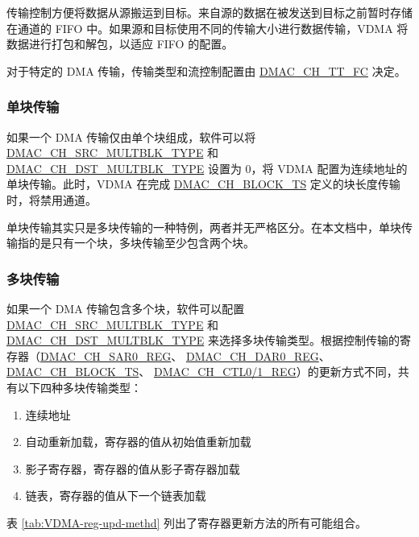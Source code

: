 \documentclass[main\_\_CN.tex]{subfiles}
\begin{document}
传输控制方便将数据从源搬运到目标。来自源的数据在被发送到目标之前暂时存储在通道的 FIFO 中。如果源和目标使用不同的传输大小进行数据传输，VDMA 将数据进行打包和解包，以适应 FIFO 的配置。

对于特定的 DMA 传输，传输类型和流控制配置由 \hyperref[fielddesc:DMACCHNTTFC]{DMAC\_CH\_TT\_FC} 决定。

\subsubsection{单块传输}

如果一个 DMA 传输仅由单个块组成，软件可以将 \hyperref[fielddesc:DMACCHNSRCMULTBLKTYPE]{DMAC\_CH\_SRC\_MULTBLK\_TYPE} 和 \hyperref[fielddesc:DMACCHNDSTMULTBLKTYPE]{DMAC\_CH\_DST\_MULTBLK\_TYPE} 设置为 0，将 VDMA 配置为连续地址的单块传输。此时，VDMA 在完成 \hyperref[fielddesc:DMACCHNBLOCKTS]{DMAC\_CH\_BLOCK\_TS} 定义的块长度传输时，将禁用通道。

\begin{tiplisting}
    单块传输其实只是多块传输的一种特例，两者并无严格区分。在本文档中，单块传输指的是只有一个块，多块传输至少包含两个块。
\end{tiplisting}

\subsubsection{多块传输}

如果一个 DMA 传输包含多个块，软件可以配置 \hyperref[fielddesc:DMACCHNSRCMULTBLKTYPE]{DMAC\_CH\_SRC\_MULTBLK\_TYPE} 和 \hyperref[fielddesc:DMACCHNDSTMULTBLKTYPE]{DMAC\_CH\_DST\_MULTBLK\_TYPE} 来选择多块传输类型。根据控制传输的寄存器（\hyperref[regdesc:DMACCHNSAR0REG]{DMAC\_CH\_SAR0\_REG}、 \hyperref[regdesc:DMACCHNDAR0REG]{DMAC\_CH\_DAR0\_REG}、 \hyperref[fielddesc:DMACCHNBLOCKTS]{DMAC\_CH\_BLOCK\_TS}、 \hyperref[regdesc:DMACCHNCTL0REG]{DMAC\_CH\_CTL0/1\_REG}）的更新方式不同，共有以下四种多块传输类型：
\begin{enumerate}
    \item 连续地址
    \item 自动重新加载，寄存器的值从初始值重新加载
    \item 影子寄存器，寄存器的值从影子寄存器加载
    \item 链表，寄存器的值从下一个链表加载
\end{enumerate}
表 \ref{tab:VDMA-reg-upd-methd} 列出了寄存器更新方法的所有可能组合。
\end{document}

